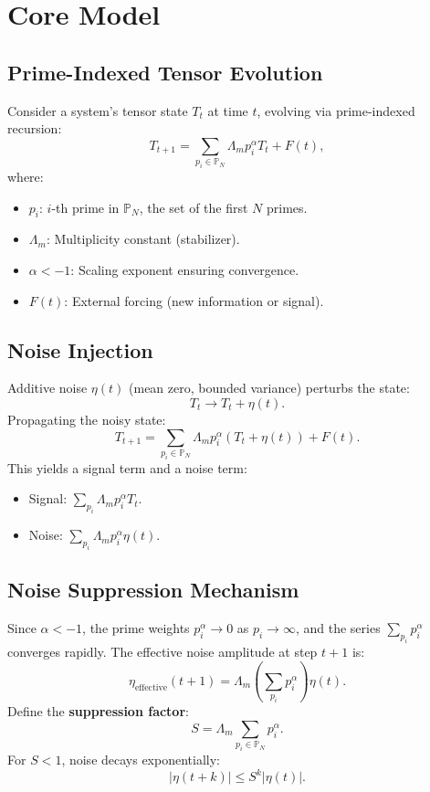 \documentclass{article}
\theoremstyle{plain}
\begin{document}
\section{Core Model}
\subsection{Prime-Indexed Tensor Evolution}
Consider a system’s tensor state \( T_t \) at time \( t \), evolving via prime-indexed recursion:
\begin{equation}
    T_{t+1} = \sum_{p_i \in \mathbb{P}_N} \Lambda_m p_i^\alpha T_t + F(t),
\end{equation}
where:
\begin{itemize}
    \item \( p_i \): \( i \)-th prime in \( \mathbb{P}_N \), the set of the first \( N \) primes.
    \item \( \Lambda_m \): Multiplicity constant (stabilizer).
    \item \( \alpha < -1 \): Scaling exponent ensuring convergence.
    \item \( F(t) \): External forcing (new information or signal).
\end{itemize}

\subsection{Noise Injection}
Additive noise \( \eta(t) \) (mean zero, bounded variance) perturbs the state:
\begin{equation}
    T_t \to T_t + \eta(t).
\end{equation}
Propagating the noisy state:
\begin{equation}
    T_{t+1} = \sum_{p_i \in \mathbb{P}_N} \Lambda_m p_i^\alpha (T_t + \eta(t)) + F(t).
\end{equation}
This yields a signal term and a noise term:
\begin{itemize}
    \item Signal: \( \sum_{p_i} \Lambda_m p_i^\alpha T_t \).
    \item Noise: \( \sum_{p_i} \Lambda_m p_i^\alpha \eta(t) \).
\end{itemize}

\subsection{Noise Suppression Mechanism}
Since \( \alpha < -1 \), the prime weights \( p_i^\alpha \to 0 \) as \( p_i \to \infty \), and the series \( \sum_{p_i} p_i^\alpha \) converges rapidly. The effective noise amplitude at step \( t+1 \) is:
\begin{equation}
    \eta_{\text{effective}}(t+1) = \Lambda_m \left( \sum_{p_i} p_i^\alpha \right) \eta(t).
\end{equation}
Define the \textbf{suppression factor}:
\begin{equation}
    S = \Lambda_m \sum_{p_i \in \mathbb{P}_N} p_i^\alpha.
\end{equation}
For \( S < 1 \), noise decays exponentially:
\begin{equation}
    |\eta(t+k)| \leq S^k |\eta(t)|.
\end{equation}
\end{document}
